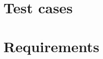 \documentclass[
    a4paper,      %
    10pt,         %
    openright,    %
    notitlepage,  %
    parskip=half, %
]{scrreprt}       %
\theoremstyle{definition}                    %
\begin{document}
\begin{flushleft}
\begin{minipage}{\linewidth}
\begin{list}{}{\setlength{\itemsep}{-\parsep}\setlength{\itemindent}{-\leftmargin}}
\item{}
\end{list}
\end{minipage}\vspace{4ex}
\end{flushleft}
\section{Test cases}
\label{sec:test-cases}

\blindtext{}

\section{Requirements}
\label{sec:requirements}
% 
% 
% 
% 
% 
% 
% 
% 
% 
% 
% 
% 
\end{document}
